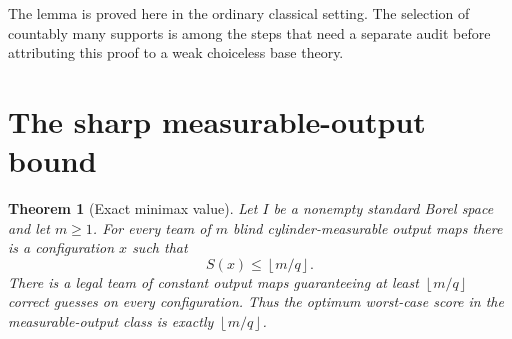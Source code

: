 \documentclass[11pt,letterpaper]{article}
\newtheorem{theorem}{Theorem}[section]
\theoremstyle{definition}
\newcommand{\floor}[1]{\left\lfloor #1\right\rfloor}
\begin{document}
The lemma is proved here in the ordinary classical setting. The selection of countably many supports is among the steps that need a separate audit before attributing this proof to a weak choiceless base theory.

\section{The sharp measurable-output bound}
\label{mbg:sec:minimax}

\begin{theorem}[Exact minimax value]
\label{mbg:thm:minimax}
Let $I$ be a nonempty standard Borel space and let $m\ge1$. For every team of $m$ blind cylinder-measurable output maps there is a configuration $x$ such that
\begin{equation}
 S(x)\le\floor{m/q}.
 \label{mbg:eq:minimax}
\end{equation}
There is a legal team of constant output maps guaranteeing at least $\floor{m/q}$ correct guesses on every configuration. Thus the optimum worst-case score in the measurable-output class is exactly $\floor{m/q}$.
\end{theorem}
\end{document}
